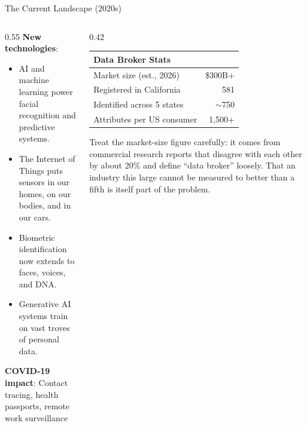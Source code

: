 ﻿\documentclass[aspectratio=169,11pt]{beamer}
\begin{document}
\begin{frame}{The Current Landscape (2020s)}
\begin{columns}[T]
\begin{column}{0.55\textwidth}
\textbf{New technologies}:
\begin{itemize}
    \item AI and machine learning power facial recognition and predictive systems.
    \item The Internet of Things puts sensors in our homes, on our bodies, and in our cars.
    \item Biometric identification now extends to faces, voices, and DNA.
    \item Generative AI systems train on vast troves of personal data.
\end{itemize}

\textbf{COVID-19 impact}: Contact tracing, health passports, remote work surveillance
\end{column}
\begin{column}{0.42\textwidth}
\begin{table}[h]
\centering
\scriptsize
\begin{tabular}{@{}lr@{}}
\toprule
\textbf{Data Broker Stats} & \\
\midrule
Market size (est., 2026) & \$300B+ \\
Registered in California & 581 \\
Identified across 5 states & $\sim$750 \\
Attributes per US consumer & 1,500+ \\
\bottomrule
\end{tabular}
\end{table}

\vspace{0.2em}
{\scriptsize Treat the market-size figure carefully: it comes from commercial research reports that disagree with each other by about 20\% and define ``data broker'' loosely. That an industry this large cannot be measured to better than a fifth is itself part of the problem.}
\end{column}
\end{columns}
\end{frame}
\end{document}
